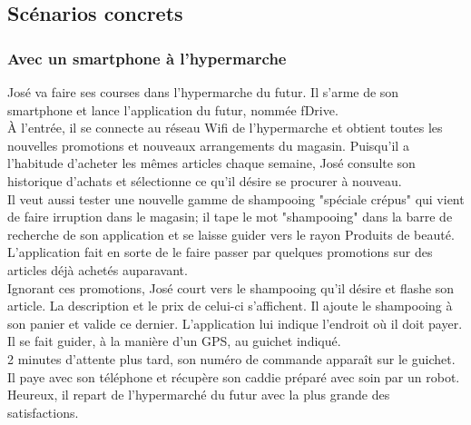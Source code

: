 \subsection{Scénarios concrets}
\subsubsection{Avec un \gls{smartphone} à l'\gls{hypermarche}}
					José va faire ses courses dans l'\gls{hypermarche} du futur. Il s'arme de son \gls{smartphone} et lance l'application du futur, nommée fDrive.\\
					À l'entrée, il se connecte au réseau \gls{Wifi} de l'\gls{hypermarche} et obtient toutes les nouvelles promotions et nouveaux arrangements du magasin. Puisqu'il a l'habitude d'acheter les mêmes articles chaque semaine, José consulte son historique d'achats et sélectionne ce qu'il désire se procurer à nouveau.\\
					Il veut aussi tester une nouvelle \gls{gamme} de shampooing "spéciale crépus" qui vient de faire irruption dans le magasin; il tape le mot "shampooing" dans la barre de recherche de son application et se laisse guider vers le rayon Produits de beauté. L'application fait en sorte de le faire passer par quelques promotions sur des articles déjà achetés auparavant.\\
					Ignorant ces promotions, José court vers le shampooing qu'il désire et flashe son article. La description et le prix de celui-ci s'affichent. Il ajoute le shampooing à son panier et valide ce dernier. L'application lui indique l'endroit où il doit payer. Il se fait guider, à la manière d'un \gls{GPS}, au guichet indiqué.\\
					2 minutes d'attente plus tard, son numéro de commande apparaît sur le guichet. Il paye avec son téléphone et récupère son \gls{caddie} préparé avec soin par un \gls{robot}. Heureux, il repart de l'hypermarché du futur avec la plus grande des satisfactions.
